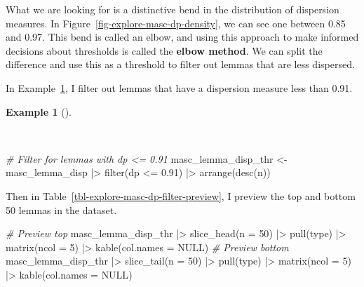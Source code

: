 \documentclass[
  letterpaper,
]{book}
\newenvironment{Shaded}{\begin{snugshade}}{\end{snugshade}}
\newcommand{\AttributeTok}[1]{\textcolor[rgb]{0.00,0.00,0.00}{#1}}
\newcommand{\CommentTok}[1]{\textcolor[rgb]{0.00,0.00,0.00}{\textit{#1}}}
\newcommand{\ConstantTok}[1]{\textcolor[rgb]{0.00,0.00,0.00}{#1}}
\newcommand{\DecValTok}[1]{\textcolor[rgb]{0.00,0.00,0.00}{#1}}
\newcommand{\FloatTok}[1]{\textcolor[rgb]{0.00,0.00,0.00}{#1}}
\newcommand{\FunctionTok}[1]{\textcolor[rgb]{0.00,0.00,0.00}{#1}}
\newcommand{\NormalTok}[1]{\textcolor[rgb]{0.00,0.00,0.00}{#1}}
\newcommand{\OtherTok}[1]{\textcolor[rgb]{0.00,0.00,0.00}{#1}}
\newcommand{\SpecialCharTok}[1]{\textcolor[rgb]{0.00,0.00,0.00}{#1}}
\theoremstyle{definition}
\newtheorem{example}{Example}[chapter]
\theoremstyle{remark}
\begin{document}
What we are looking for is a distinctive bend in the distribution of
dispersion measures. In Figure~\ref{fig-explore-masc-dp-density}, we can
see one between 0.85 and 0.97. This bend is called an elbow, and using
this approach to make informed decisions about thresholds is called the
\textbf{elbow method}. We can split the difference and use this as a
threshold to filter out lemmas that are less dispersed.

In Example~\ref{exm-explore-masc-dp-filter}, I filter out lemmas that
have a dispersion measure less than 0.91.

\begin{example}[]\protect\hypertarget{exm-explore-masc-dp-filter}{}\label{exm-explore-masc-dp-filter}

~

\begin{Shaded}
\begin{Highlighting}[]
\CommentTok{\# Filter for lemmas with dp \textless{}= 0.91}
\NormalTok{masc\_lemma\_disp\_thr }\OtherTok{\textless{}{-}}
\NormalTok{  masc\_lemma\_disp }\SpecialCharTok{|\textgreater{}}
  \FunctionTok{filter}\NormalTok{(dp }\SpecialCharTok{\textless{}=} \FloatTok{0.91}\NormalTok{) }\SpecialCharTok{|\textgreater{}}
  \FunctionTok{arrange}\NormalTok{(}\FunctionTok{desc}\NormalTok{(n))}
\end{Highlighting}
\end{Shaded}

\end{example}

Then in Table~\ref{tbl-explore-masc-dp-filter-preview}, I preview the
top and bottom 50 lemmas in the dataset.

\begin{Shaded}
\begin{Highlighting}[]
\CommentTok{\# Preview top}
\NormalTok{masc\_lemma\_disp\_thr }\SpecialCharTok{|\textgreater{}}
  \FunctionTok{slice\_head}\NormalTok{(}\AttributeTok{n =} \DecValTok{50}\NormalTok{) }\SpecialCharTok{|\textgreater{}}
  \FunctionTok{pull}\NormalTok{(type) }\SpecialCharTok{|\textgreater{}}
  \FunctionTok{matrix}\NormalTok{(}\AttributeTok{ncol =} \DecValTok{5}\NormalTok{) }\SpecialCharTok{|\textgreater{}}
  \FunctionTok{kable}\NormalTok{(}\AttributeTok{col.names =} \ConstantTok{NULL}\NormalTok{)}
\CommentTok{\# Preview bottom}
\NormalTok{masc\_lemma\_disp\_thr }\SpecialCharTok{|\textgreater{}}
  \FunctionTok{slice\_tail}\NormalTok{(}\AttributeTok{n =} \DecValTok{50}\NormalTok{) }\SpecialCharTok{|\textgreater{}}
  \FunctionTok{pull}\NormalTok{(type) }\SpecialCharTok{|\textgreater{}}
  \FunctionTok{matrix}\NormalTok{(}\AttributeTok{ncol =} \DecValTok{5}\NormalTok{) }\SpecialCharTok{|\textgreater{}}
  \FunctionTok{kable}\NormalTok{(}\AttributeTok{col.names =} \ConstantTok{NULL}\NormalTok{)}
\end{Highlighting}
\end{Shaded}
\end{document}
